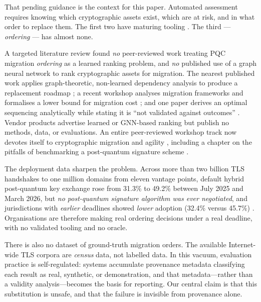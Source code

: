 \documentclass[conference]{IEEEtran}
\begin{document}
That pending guidance is the context for this paper. Automated assessment requires knowing
which cryptographic assets exist, which are at risk, and in what order to replace them. The
first two have maturing tooling \cite{cyclonedx, hess2026, cryptoscope}. The third ---
\emph{ordering} --- has almost none.

A targeted literature review found \emph{no} peer-reviewed work treating PQC migration
\emph{ordering} as a learned ranking problem, and \emph{no} published use of a graph neural
network to rank cryptographic assets for migration. The nearest published work applies
graph-theoretic, non-learned dependency analysis to produce a replacement roadmap
\cite{hasan2024}; a recent workshop analyses migration frameworks and formalises a lower
bound for migration cost \cite{nzetchuen2026, loebenberger2026}; and one paper derives an
optimal sequencing analytically while stating it is ``not validated against outcomes''
\cite{shaw2026}. Vendor products advertise learned or GNN-based ranking \cite{qcipher} but
publish no methods, data, or evaluations. An entire peer-reviewed workshop track now
devotes itself to cryptographic migration and agility \cite{magics2026}, including a
chapter on the pitfalls of benchmarking a post-quantum signature scheme \cite{riou2026}.

The deployment data sharpen the problem. Across more than two billion TLS handshakes to
one million domains from eleven vantage points, default hybrid post-quantum key exchange
rose from 31.3\% to 49.2\% between July 2025 and March 2026, but \emph{no post-quantum
signature algorithm was ever negotiated}, and jurisdictions with \emph{earlier} deadlines
showed \emph{lower} adoption (32.4\% versus 45.7\%) \cite{mindthegap2026}. Organisations
are therefore making real ordering decisions under a real deadline, with no validated
tooling and no oracle.

There is also no dataset of ground-truth migration orders. The available Internet-wide TLS
corpora \cite{durumeric2013, eckersley2011, chung2016, heninger2012} are \emph{census}
data, not labelled data. In this vacuum, evaluation practice is self-regulated: systems
accumulate provenance metadata classifying each result as real, synthetic, or demonstration,
and that metadata---rather than a validity analysis---becomes the basis for reporting. Our
central claim is that this substitution is unsafe, and that the failure is invisible from
provenance alone.
\end{document}
